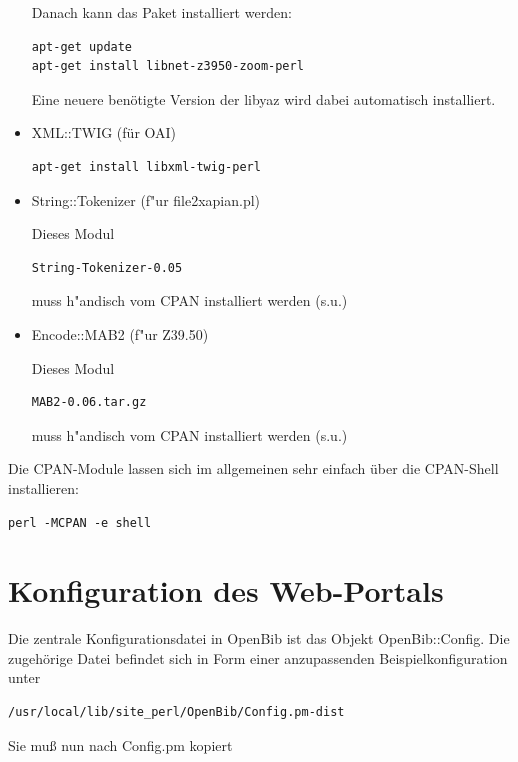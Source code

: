 \documentclass[11pt, twoside, a4paper, BCOR8mm, DIV12, bibtotoc,idxtotoc]{scrbook}
\begin{document}
\begin{itemize}
Danach kann das Paket installiert werden:
\begin{verbatim}
apt-get update
apt-get install libnet-z3950-zoom-perl
\end{verbatim}

Eine neuere benötigte Version der libyaz wird dabei automatisch
installiert.
\item XML::TWIG (für OAI)
\begin{verbatim}
apt-get install libxml-twig-perl
\end{verbatim}

\item String::Tokenizer (f"ur file2xapian.pl)

Dieses Modul 

\begin{verbatim}
String-Tokenizer-0.05
\end{verbatim}

muss h"andisch vom CPAN installiert werden (s.u.)

\item Encode::MAB2 (f"ur Z39.50)

Dieses Modul 

\begin{verbatim}
MAB2-0.06.tar.gz
\end{verbatim}

muss h"andisch vom CPAN installiert werden (s.u.)

\end{itemize}

Die CPAN-Module lassen sich im allgemeinen sehr einfach über die
CPAN-Shell installieren:

\begin{verbatim}
perl -MCPAN -e shell
\end{verbatim}

\section{Konfiguration des Web-Portals}
\label{sec:confportal}

Die zentrale Konfigurationsdatei in OpenBib ist das Objekt
OpenBib::Config. Die zugehörige Datei befindet sich in Form einer
anzupassenden Beispielkonfiguration unter 

\begin{verbatim}
/usr/local/lib/site_perl/OpenBib/Config.pm-dist
\end{verbatim}

Sie muß nun nach Config.pm kopiert 
\end{document}
